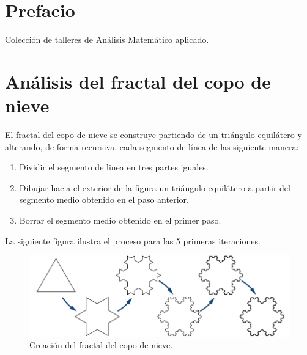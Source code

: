 \documentclass[
  a4paper,
]{scrreport}
\providecommand{\tightlist}{%
  \setlength{\itemsep}{0pt}\setlength{\parskip}{0pt}}\usepackage{longtable,booktabs,array}
\begin{document}
\hypertarget{prefacio}{%
\chapter*{Prefacio}\label{prefacio}}


Colección de talleres de Análisis Matemático aplicado.


\hypertarget{anuxe1lisis-del-fractal-del-copo-de-nieve}{%
\chapter{Análisis del fractal del copo de
nieve}\label{anuxe1lisis-del-fractal-del-copo-de-nieve}}

El fractal del copo de nieve se construye partiendo de un triángulo
equilátero y alterando, de forma recursiva, cada segmento de línea de
las siguiente manera:

\begin{enumerate}
\def\labelenumi{\arabic{enumi}.}
\tightlist
\item
  Dividir el segmento de linea en tres partes iguales.
\item
  Dibujar hacia el exterior de la figura un triángulo equilátero a
  partir del segmento medio obtenido en el paso anterior.
\item
  Borrar el segmento medio obtenido en el primer paso.
\end{enumerate}

La siguiente figura ilustra el proceso para las 5 primeras iteraciones.

\begin{figure}

{\centering \includegraphics{./img/series/copo-nieve.png}

}

\caption{Creación del fractal del copo de nieve.}

\end{figure}
\end{document}
